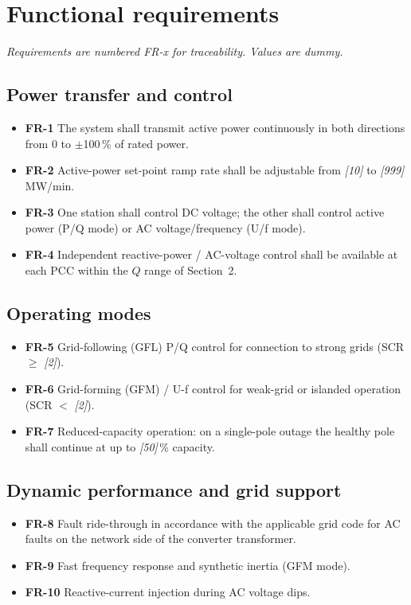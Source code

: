 \section{Functional requirements}

\emph{Requirements are numbered FR-x for traceability. Values are dummy.}

\subsection{Power transfer and control}
\begin{itemize}\setlength{\itemsep}{0.25em}
  \item \textbf{FR-1} The system shall transmit active power continuously in
        both directions from 0 to $\pm$100\,\% of rated power.
  \item \textbf{FR-2} Active-power set-point ramp rate shall be adjustable from
        \emph{[10]} to \emph{[999]}\,MW/min.
  \item \textbf{FR-3} One station shall control DC voltage; the other shall
        control active power (P/Q mode) or AC voltage/frequency (U/f mode).
  \item \textbf{FR-4} Independent reactive-power / AC-voltage control shall be
        available at each PCC within the $Q$ range of Section~2.
\end{itemize}

\subsection{Operating modes}
\begin{itemize}\setlength{\itemsep}{0.25em}
  \item \textbf{FR-5} Grid-following (GFL) P/Q control for connection to strong
        grids (SCR $\ge$ \emph{[2]}).
  \item \textbf{FR-6} Grid-forming (GFM) / U-f control for weak-grid or
        islanded operation (SCR $<$ \emph{[2]}).
  \item \textbf{FR-7} Reduced-capacity operation: on a single-pole outage the
        healthy pole shall continue at up to \emph{[50]}\,\% capacity.
\end{itemize}

\subsection{Dynamic performance and grid support}
\begin{itemize}\setlength{\itemsep}{0.25em}
  \item \textbf{FR-8} Fault ride-through in accordance with the applicable grid
        code for AC faults on the network side of the converter transformer.
  \item \textbf{FR-9} Fast frequency response and synthetic inertia (GFM mode).
  \item \textbf{FR-10} Reactive-current injection during AC voltage dips.
\end{itemize}


